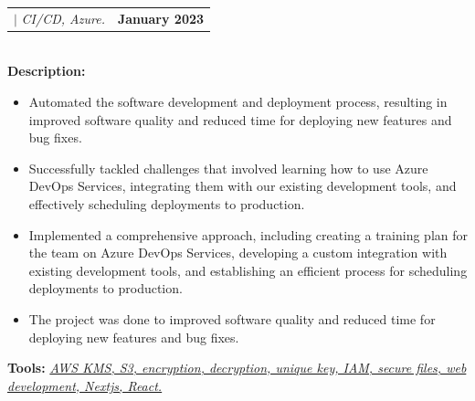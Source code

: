 \documentclass[letterpaper,11pt]{article}
\makeatletter
\newcommand{\resumeItem}[1]{
  \item\small{
    {#1 \vspace{-2pt}}
  }
}
\newcommand{\resumeProjectHeading}[2]{
    \item
    \begin{tabular*}{1.001\textwidth}{l@{\extracolsep{\fill}}r}
      \small#1 & \textbf{\small #2}\\
    \end{tabular*}\vspace{-7pt}
}
\newcommand{\resumeItemListStart}{\begin{itemize}}
\newcommand{\resumeItemListEnd}{\end{itemize}\vspace{-5pt}}
\makeatother
\begin{document}








        \resumeProjectHeading
        {\textbf{\herf{}{Azure DevOps}} $|$ \emph{CI/CD, Azure.}}{January 2023}\\
        \vspace{6pt}
        \textbf{Description:}
        \vspace{-5pt}
          \resumeItemListStart
          \resumeItem{Automated the software development and deployment process, resulting in improved software quality and reduced time for deploying new features and bug fixes.}
          \resumeItem{Successfully tackled challenges that involved learning how to use Azure DevOps Services, integrating them with our existing development tools, and effectively scheduling deployments to production.}
          \resumeItem{Implemented a comprehensive approach, including creating a training plan for the team on Azure DevOps Services, developing a custom integration with existing development tools, and establishing an efficient process for scheduling deployments to production.}
          \resumeItem{The project was done to improved software quality and reduced time for deploying new features and bug fixes.}
          \resumeItemListEnd 
          \textbf{Tools:}\emph{ \href{https://yakkshit.com}{AWS KMS, S3, encryption, decryption, unique key, IAM, secure files, web development, Nextjs, React.}}
          
\end{document}
